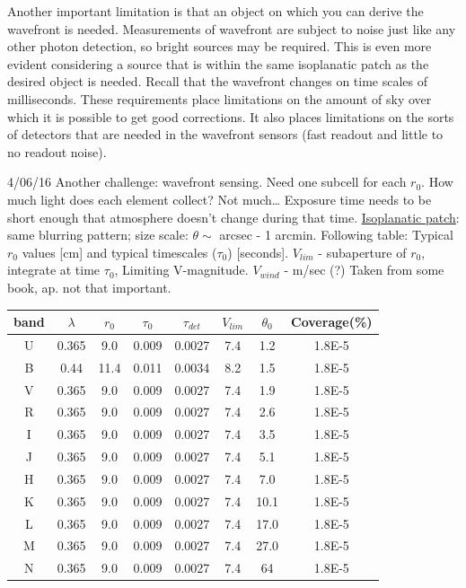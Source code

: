 \documentclass[12pt]{article}
\newcommand{\mynotes}[1]{\textcolor{myBlue}{#1}}
\begin{document}
Another important limitation is that an object on which you can derive the
wavefront is needed. Measurements of wavefront are subject to noise just like
any other photon detection, so bright sources may be required. This is even
more evident considering a source that is within the same isoplanatic patch as
the desired object is needed. Recall that the wavefront changes on time scales
of milliseconds. These requirements place limitations on the amount of sky over
which it is possible to get good corrections. It also places limitations on the
sorts of detectors that are needed in the wavefront sensors (fast readout and
little to no readout noise).

\mynotes{4/06/16 Another challenge: wavefront sensing. Need one subcell for
each $r_{0}$. How much light does each element collect? Not much\ldots
Exposure time needs to be short enough that atmosphere doesn't change during
that time. \underline{Isoplanatic patch}: same blurring pattern;
size scale: $\theta \sim$ arcsec - 1 arcmin.
Following table:
Typical $r_{0}$ values [cm] and typical timescales ($\tau_{0}$) [seconds].
$V_{lim}$ - subaperture of
$r_{0}$,
integrate at time
$\tau_{0}$,
Limiting V-magnitude.
$V_{wind}$ - m/sec (?)
Taken from some book, ap. not that important.
}

\begin{table}[th]
\centering
\begin{tabular}{c c c c c c c c}
    band & $\lambda$ & $r_0$ & $\tau_0$ & $\tau_{det}$ & $V_{lim}$ &
    $\theta_0$ & Coverage(\%)\\
    \hline\hline
    U & 0.365 & 9.0 & 0.009 & 0.0027 & 7.4 & 1.2 & 1.8E-5\\
    B & 0.44 & 11.4 & 0.011 & 0.0034 & 8.2 & 1.5 & 1.8E-5\\
    V & 0.365 & 9.0 & 0.009 & 0.0027 & 7.4 & 1.9 & 1.8E-5\\
    R & 0.365 & 9.0 & 0.009 & 0.0027 & 7.4 & 2.6 & 1.8E-5\\
    I & 0.365 & 9.0 & 0.009 & 0.0027 & 7.4 & 3.5 & 1.8E-5\\
    J & 0.365 & 9.0 & 0.009 & 0.0027 & 7.4 & 5.1 & 1.8E-5\\
    H & 0.365 & 9.0 & 0.009 & 0.0027 & 7.4 & 7.0 & 1.8E-5\\
    K & 0.365 & 9.0 & 0.009 & 0.0027 & 7.4 & 10.1 & 1.8E-5\\
    L & 0.365 & 9.0 & 0.009 & 0.0027 & 7.4 & 17.0 & 1.8E-5\\
    M & 0.365 & 9.0 & 0.009 & 0.0027 & 7.4 & 27.0 & 1.8E-5\\
    N & 0.365 & 9.0 & 0.009 & 0.0027 & 7.4 & 64 & 1.8E-5\\
    \hline
    \end{tabular}
\end{table}
\end{document}

